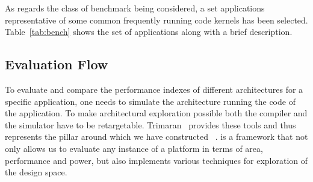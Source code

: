 As regards the class of benchmark being considered, a set applications representative of some common
frequently running code kernels has been selected. Table~\ref{tab:bench} shows the set of applications
along with a brief description.

\begin{table}
\end{table}

\subsection{Evaluation Flow}

To evaluate and compare the performance indexes of different
architectures for a specific application, one needs to simulate the
architecture running the code of the application. To make
architectural exploration possible both the compiler and the simulator
have to be retargetable. Trimaran~\cite{trimaran_hp} provides these
tools and thus represents the pillar around which we have constructed
\ee~\cite{palpatti_estimedia03}. \ee{} is a framework that not only
allows us to evaluate any instance of a platform in terms of area,
performance and power, but also implements various techniques for
exploration of the design space.

